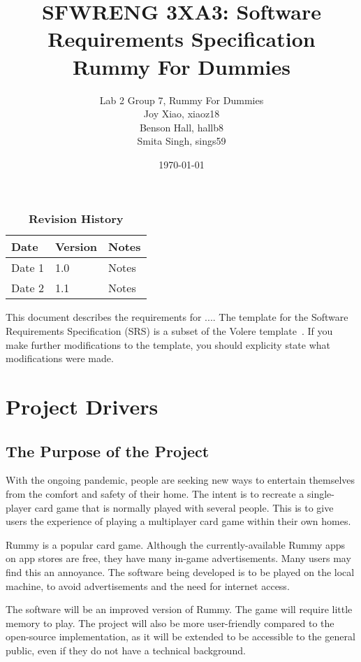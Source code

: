 \documentclass[12pt, titlepage]{article}
\title{SFWRENG 3XA3: Software Requirements Specification\\Rummy For Dummies}
\author{Lab 2 Group 7, Rummy For Dummies
		\\ Joy Xiao, xiaoz18
		\\ Benson Hall, hallb8
		\\ Smita Singh, sings59
}
\date{\today}
\begin{document}
\maketitle

\tableofcontents
\listoftables
\listoffigures

\begin{table}[bp]
\caption{\bf Revision History}
\begin{tabularx}{\textwidth}{p{3cm}p{2cm}X}
\toprule {\bf Date} & {\bf Version} & {\bf Notes}\\
\midrule
Date 1 & 1.0 & Notes\\
Date 2 & 1.1 & Notes\\
\bottomrule
\end{tabularx}
\end{table}

\newpage


This document describes the requirements for ....  The template for the Software
Requirements Specification (SRS) is a subset of the Volere
template~\citep{RobertsonAndRobertson2012}.  If you make further modifications
to the template, you should explicity state what modifications were made.

\section{Project Drivers}

\subsection{The Purpose of the Project}
With the ongoing pandemic, people are seeking new ways to entertain themselves from the comfort and safety of their home. The intent is to recreate a single-player card game that is normally played with several people. This is to give users the experience of playing a multiplayer card game within their own homes.

Rummy is a popular card game. Although the currently-available Rummy apps on app stores are free, they have many in-game advertisements. Many users may find this an annoyance. The software being developed is to be played on the local machine, to avoid advertisements and the need for internet access.

The software will be an improved version of Rummy. The game will require little memory to play. The project will also be more user-friendly compared to the open-source implementation, as it will be extended to be accessible to the general public, even if they do not have a technical background.
\end{document}
